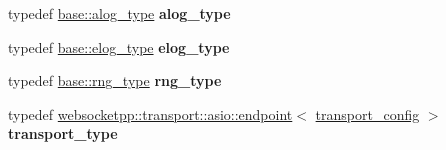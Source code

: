 \begin{DoxyCompactItemize}
\item 
typedef \hyperlink{classwebsocketpp_1_1log_1_1basic}{base\+::alog\+\_\+type} {\bfseries alog\+\_\+type}\hypertarget{structconfig__tls_a9e0a6c6a2f7f1b7ec5182b6af5b84395}{}\label{structconfig__tls_a9e0a6c6a2f7f1b7ec5182b6af5b84395}

\item 
typedef \hyperlink{classwebsocketpp_1_1log_1_1basic}{base\+::elog\+\_\+type} {\bfseries elog\+\_\+type}\hypertarget{structconfig__tls_af8e2db18d805b737336c66ae8e387ebf}{}\label{structconfig__tls_af8e2db18d805b737336c66ae8e387ebf}

\item 
typedef \hyperlink{classwebsocketpp_1_1random_1_1none_1_1int__generator}{base\+::rng\+\_\+type} {\bfseries rng\+\_\+type}\hypertarget{structconfig__tls_a7dd19da184abbffd3a0ac31b92ea3d07}{}\label{structconfig__tls_a7dd19da184abbffd3a0ac31b92ea3d07}

\item 
typedef \hyperlink{classwebsocketpp_1_1transport_1_1asio_1_1endpoint}{websocketpp\+::transport\+::asio\+::endpoint}$<$ \hyperlink{structconfig__tls_1_1transport__config}{transport\+\_\+config} $>$ {\bfseries transport\+\_\+type}\hypertarget{structconfig__tls_a0b80a63406ce688a82a966f69a2de6f5}{}\label{structconfig__tls_a0b80a63406ce688a82a966f69a2de6f5}

\end{DoxyCompactItemize}
